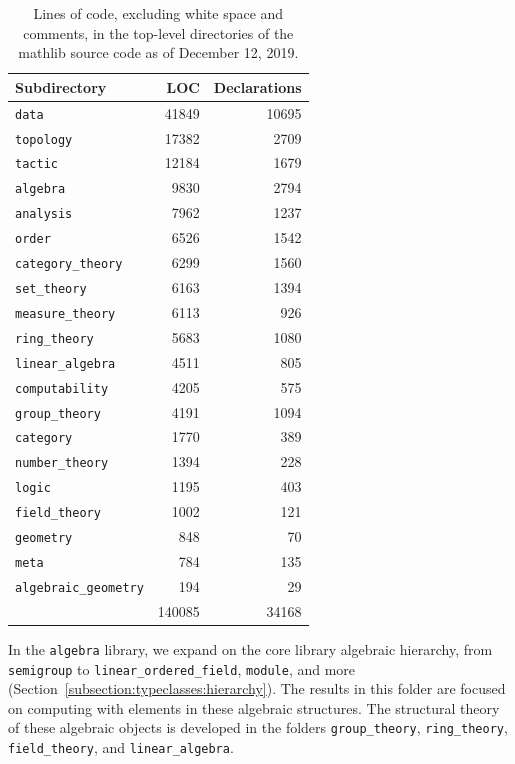 \documentclass[sigplan]{acmart}\settopmatter{}
\newcommand{\mathlib}{\textsf{mathlib}\xspace}
\newcommand{\corelib}{\textsf{core} library\xspace}
\begin{document}
\begin{table}
  \begin{tabular}{lrr}
    \bf Subdirectory & \bf LOC & \bf Declarations  \\ \hline
    \texttt{data} & 41849 & 10695 \\
    \texttt{topology} & 17382 & 2709 \\
    \texttt{tactic} & 12184 & 1679 \\
    \texttt{algebra} & 9830 & 2794 \\
    \texttt{analysis} & 7962 & 1237 \\
    \texttt{order} & 6526 & 1542 \\
    \texttt{category\_theory} & 6299 & 1560 \\
    \texttt{set\_theory} & 6163 & 1394 \\
    \texttt{measure\_theory} & 6113 & 926 \\
    \texttt{ring\_theory} & 5683 & 1080 \\
    \texttt{linear\_algebra} & 4511 & 805 \\
    \texttt{computability} & 4205 & 575 \\
    \texttt{group\_theory} & 4191 & 1094 \\
    \texttt{category} & 1770 & 389 \\
    \texttt{number\_theory} & 1394 & 228 \\
    \texttt{logic} & 1195 & 403 \\
    \texttt{field\_theory} & 1002 & 121 \\
    \texttt{geometry} & 848 & 70 \\
    \texttt{meta} & 784 & 135 \\
    \texttt{algebraic\_geometry} & 194 & 29 \\ \hline
      & 140085 & 34168
  \end{tabular}
  \caption{Lines of code, excluding white space and comments, in the top-level directories of the \mathlib source code as of December 12, 2019.}
  \label{table:directories}
\end{table}

In the \texttt{algebra} library, we expand on the \corelib algebraic hierarchy, from \lstinline{semigroup} to \lstinline{linear_ordered_field}, \lstinline{module}, and more (Section~\ref{subsection:typeclasses:hierarchy}).
The results in this folder are focused on computing with elements in these algebraic structures.
The structural theory of these algebraic objects is developed in the folders \texttt{group\_theory}, \texttt{ring\_theory}, \texttt{field\_theory}, and \texttt{linear\_algebra}.
\end{document}
